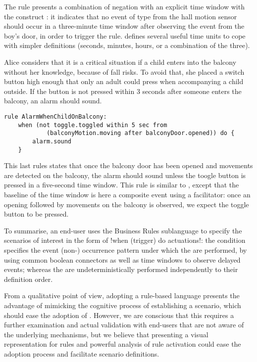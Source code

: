 \begin{description}[leftmargin=0cm]
	The rule  presents a combination of negation with an explicit time window with the construct : it indicates that no event of type  from the hall motion sensor should occur in a three-minute time window after observing the  event from the boy's door, in order to trigger the rule. \IOTDSL defines several useful time units to cope with simpler definitions (seconds, minutes, hours, or a combination of the three). 
	

	\item[Report unsupervised children on balcony] Alice considers that it is a critical situation if a child enters into the balcony without her knowledge, because of fall risks. To avoid that, she placed a switch button high enough that only an adult could press when accompanying a child outside. If the button is not pressed within 3 seconds after someone enters the balcony, an alarm should sound.
	\begin{lstlisting}[language=iotdsl,
							label=lis:balcony-rule,
		caption=Rules to sound the alarm in case of an unsupervised child on the balcony]
rule AlarmWhenChildOnBalcony:	
	when (not toggle.toggled within 5 sec from 
			(balconyMotion.moving after balconyDoor.opened)) do {
		alarm.sound
	}
	\end{lstlisting}
	This last rules states that once the balcony door has been opened and movements are detected on the balcony, the alarm should sound unless the toogle button is pressed in a five-second time window. This rule is similar to , except that the baseline of the time window is here a composite event using a facilitator: once an opening followed by movements on the balcony is observed, we expect the toggle button to be pressed. 
\end{description}

To summarise, an end-user uses the Business Rules sublanguage to specify the scenarios of interest in the form of \inlineI!when (trigger) do {actuations}!: the  condition specifies the event (non-) occurrence pattern under which the  are performed, by using common boolean connectors as well as time windows to observe delayed events; whereas the  are undeterministically performed independently to their definition order. 

From a qualitative point of view, adopting a rule-based language presents the advantage of mimicking the cognitive process of establishing a scenario, which should ease the adoption of \IOTDSL. However, we are conscious that this requires a further examination and actual validation with end-users that are not aware of the underlying \DSL mechanisms, but we believe that presenting a visual representation for rules and powerful analysis of rule activation could ease the adoption process and facilitate scenario definitions.



